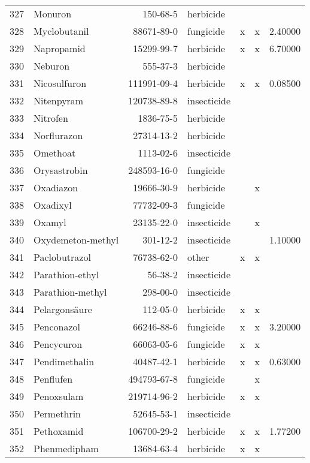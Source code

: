 \begin{longtable}{lp{3cm}rlp{1cm}p{1cm}p{1.5cm}}
  327 & Monuron & 150-68-5 & herbicide &  &  &  \\ 
  328 & Myclobutanil & 88671-89-0 & fungicide & x & x & 2.40000 \\ 
  329 & Napropamid & 15299-99-7 & herbicide & x & x & 6.70000 \\ 
  330 & Neburon & 555-37-3 & herbicide &  &  &  \\ 
  331 & Nicosulfuron & 111991-09-4 & herbicide & x & x & 0.08500 \\ 
  332 & Nitenpyram & 120738-89-8 & insecticide &  &  &  \\ 
  333 & Nitrofen & 1836-75-5 & herbicide &  &  &  \\ 
  334 & Norflurazon & 27314-13-2 & herbicide &  &  &  \\ 
  335 & Omethoat & 1113-02-6 & insecticide &  &  &  \\ 
  336 & Orysastrobin & 248593-16-0 & fungicide &  &  &  \\ 
  337 & Oxadiazon & 19666-30-9 & herbicide &  & x &  \\ 
  338 & Oxadixyl & 77732-09-3 & fungicide &  &  &  \\ 
  339 & Oxamyl & 23135-22-0 & insecticide &  & x &  \\ 
  340 & Oxydemeton-methyl & 301-12-2 & insecticide &  &  & 1.10000 \\ 
  341 & Paclobutrazol & 76738-62-0 & other & x & x &  \\ 
  342 & Parathion-ethyl & 56-38-2 & insecticide &  &  &  \\ 
  343 & Parathion-methyl & 298-00-0 & insecticide &  &  &  \\ 
  344 & Pelargonsäure & 112-05-0 & herbicide & x & x &  \\ 
  345 & Penconazol & 66246-88-6 & fungicide & x & x & 3.20000 \\ 
  346 & Pencycuron & 66063-05-6 & fungicide & x & x &  \\ 
  347 & Pendimethalin & 40487-42-1 & herbicide & x & x & 0.63000 \\ 
  348 & Penflufen & 494793-67-8 & fungicide &  & x &  \\ 
  349 & Penoxsulam & 219714-96-2 & herbicide & x & x &  \\ 
  350 & Permethrin & 52645-53-1 & insecticide &  &  &  \\ 
  351 & Pethoxamid & 106700-29-2 & herbicide & x & x & 1.77200 \\ 
  352 & Phenmedipham & 13684-63-4 & herbicide & x & x &  \\ 

\end{longtable}
